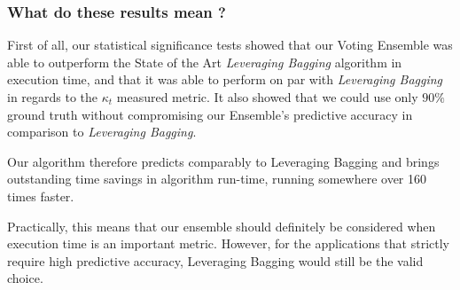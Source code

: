 \subsubsection{What do these results mean ?}
First of all, our statistical significance tests showed that our Voting Ensemble was able to outperform the State of the Art \textit{Leveraging Bagging} algorithm in execution time, and that it was able to perform on par with \textit{Leveraging Bagging} in regards to the $\kappa_t$ measured metric. It also showed that we could use only $90\%$ ground truth without compromising our Ensemble's predictive accuracy in comparison to \textit{Leveraging Bagging}.

Our algorithm therefore predicts comparably to Leveraging Bagging and brings outstanding time savings in algorithm run-time, running somewhere over 160 times faster.

Practically, this means that our ensemble should definitely be considered when execution time is an important metric. However, for the applications that strictly require high predictive accuracy, Leveraging Bagging would still be the valid choice.
